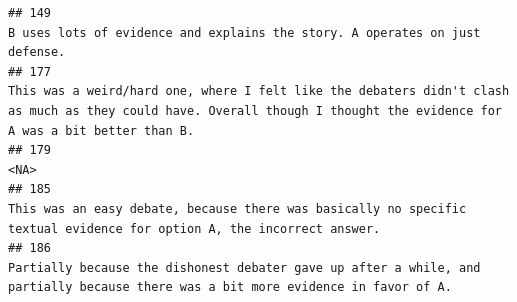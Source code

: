 \documentclass[
]{article}
\begin{document}
\begin{verbatim}
## 149                                                                                                                                                                                                                                                                                                                                                                                                                                                                                                                       B uses lots of evidence and explains the story. A operates on just defense. 
## 177                                                                                                                                                                                                                                                                                                                                                                                                                           This was a weird/hard one, where I felt like the debaters didn't clash as much as they could have. Overall though I thought the evidence for A was a bit better than B. 
## 179                                                                                                                                                                                                                                                                                                                                                                                                                                                                                                                                                                                               <NA>
## 185                                                                                                                                                                                                                                                                                                                                                                                                                                                                             This was an easy debate, because there was basically no specific textual evidence for option A, the incorrect answer. 
## 186                                                                                                                                                                                                                                                                                                                                                                                                                                                                  Partially because the dishonest debater gave up after a while, and partially because there was a bit more evidence in favor of A.

\end{verbatim}
\end{document}
